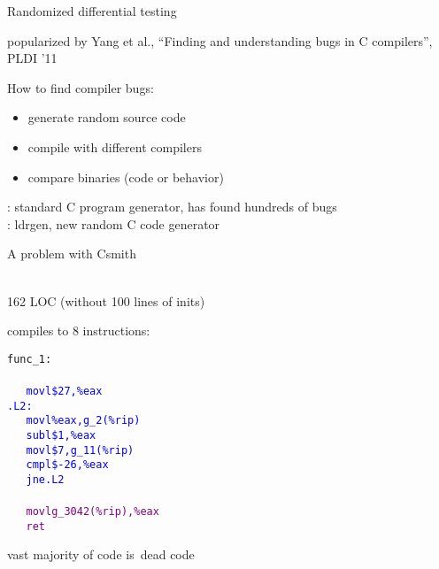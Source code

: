 \documentclass{beamer}
\begin{document}
\begin{frame}{Randomized differential testing}

popularized by Yang et al., ``Finding and understanding bugs in C
compilers'', PLDI '11
\\[1ex]

\begin{block}{How to find compiler bugs:}
\begin{itemize}
\item generate random source code
\item compile with different compilers
\item compare binaries (code or behavior)
\end{itemize}
\end{block}

: standard C program generator, has found hundreds of bugs
\\[1ex]

: ldrgen, new random C code generator

\end{frame}

\begin{frame}{A problem with Csmith}

\begin{minipage}[t]{.4\textwidth}
\begin{alltt}
%
\end{alltt}
\end{minipage}
\hfill
\begin{minipage}[t]{.55\textwidth}
\mbox{}\\[-20ex]  %
162 LOC (without 100 lines of inits)
\pause

compiles to 8 instructions:
\begin{alltt}
%\scalebox{0.75}{\parbox{\textwidth}{}}
\scriptsize
func\_1: \\
\textcolor{blue}{
\mbox{ \ \ } movl	\$27, \%eax \\
.L2: \\
\mbox{ \ \ } movl	\%eax, g\_2(\%rip) \\
\mbox{ \ \ } subl	\$1, \%eax \\
\textcolor{dbrown}{\mbox{ \ \ } movl	\$7, g\_11(\%rip)} \\
\mbox{ \ \ } cmpl	\$-26, \%eax \\
\mbox{ \ \ } jne	.L2 \\
}\textcolor{purple}{
\mbox{ \ \ } movl	g\_3042(\%rip), \%eax \\
\mbox{ \ \ } ret \\
}
\end{alltt}

vast majority of code is~\alert{dead code}
\end{minipage}

\end{frame}
\end{document}

